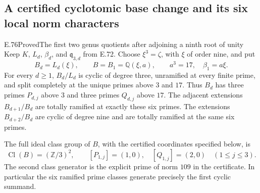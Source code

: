 \subsection{A certified cyclotomic base change and its six local norm characters}

\begin{statement}{E.76}{Proved}{The first two genus quotients after adjoining a ninth root of unity}
Keep $K$, $L_d$, $\beta_d$, and $\mathfrak q_{3,d}$ from E.72.
Choose $\xi^3=\zeta$, with $\xi$ of order nine, and put
\[
 B_d=L_d(\xi),\qquad B=B_1
   =\mathbb Q(\xi,a),\qquad a^3=17,\quad\beta_1=a\xi.
 \tag{E76.1}
\]
For every $d\ge1$, $B_d/L_d$ is cyclic of degree three,
unramified at every finite prime, and split completely at the
unique primes above $3$ and $17$. Thus $B_d$ has three primes
$P_{d,j}$ above $3$ and three primes $Q_{d,j}$ above $17$.
The adjacent extensions $B_{d+1}/B_d$ are totally ramified
at exactly these six primes. The extensions $B_{d+2}/B_d$
are cyclic of degree nine and are totally ramified at the same
six primes.

The full ideal class group of $B$, with the certified coordinates
specified below, is
\[
 \operatorname{Cl}(B)=(\mathbb Z/3)^2,\qquad
 [P_{1,j}]=(1,0),\quad[Q_{1,j}]=(2,0)\quad(1\le j\le3).
 \tag{E76.2}
\]
The second class generator is the explicit prime of norm $109$
in the certificate. In particular the six ramified prime classes
generate precisely the first cyclic summand.


\end{statement}
